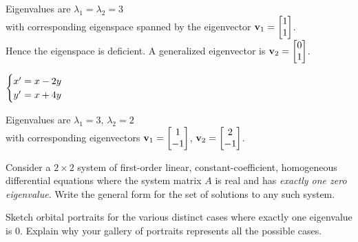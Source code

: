 \documentclass[boxes]{gsypset}
\begin{document}
\begin{problem}
\begin{subproblems}
			Eigenvalues are $\lambda_1 = \lambda_2 = 3$ \\
			with corresponding eigenspace spanned by the eigenvector $\mathbf{v}_1 = \begin{bmatrix}1 \\1\end{bmatrix}$. \\
			Hence the eigenspace is deficient. 
			A generalized eigenvector is $\mathbf{v}_2 = \begin{bmatrix}0 \\1\end{bmatrix}$.
			\begin{solution}
				
			\end{solution}
		\subproblem 
			$\begin{cases}
				x'&\hspace{-.1in}=x-2y \\
				y'&\hspace{-.1in}=x+4y
			\end{cases}$
			
			Eigenvalues are $\lambda_1 = 3$, $\lambda_2 = 2$ \\
			with corresponding eigenvectors $\mathbf{v}_1 = \begin{bmatrix}1 \\ -1\end{bmatrix}$, $\mathbf{v}_2 = \begin{bmatrix}2 \\ -1\end{bmatrix}$.
			\begin{solution}
				
			\end{solution}
	\end{subproblems}
\end{problem}

\begin{problem} 
	\begin{subproblems}
		\subproblem 
			Consider a $2\times 2$ system of first-order linear, constant-coefficient, 
			homogeneous differential equations where the system matrix $A$ is real and 
			has \textit{exactly one zero eigenvalue}. 
		  Write the general form for the set of solutions to any such system.
			\begin{solution}
				
			\end{solution}
		\subproblem 
			Sketch orbital portraits for the various distinct cases where exactly one eigenvalue is $0$. 
		  Explain why your gallery of portraits represents all the possible cases.
			\begin{solution}
				
			\end{solution}
	\end{subproblems}
\end{problem}
\end{document}
